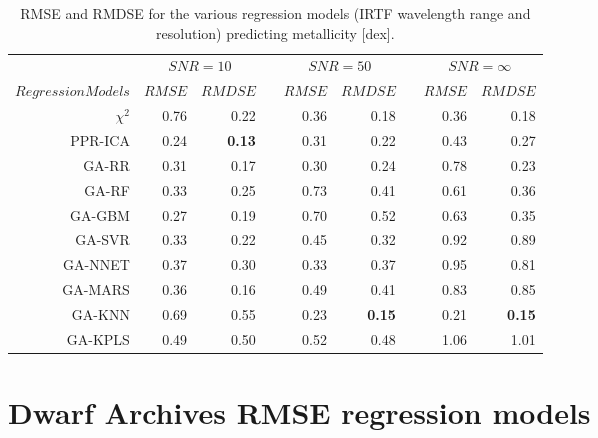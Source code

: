 \begin{table*}\centering
\begin{tabular}{@{}rrrcrrcrr@{}}\hline
& \multicolumn{2}{c}{$SNR = 10$} & \phantom{ab}& \multicolumn{2}{c}{$SNR = 50$} &
\phantom{ab} & \multicolumn{2}{c}{$SNR = \infty$}\\
\cmidrule{2-3} \cmidrule{5-6} \cmidrule{8-9}
$Regression Models$ & $RMSE$ & $RMDSE$ && $RMSE$ & $RMDSE$     && $RMSE$       & $RMDSE$ \\ \midrule
$\chi^2$    & 0.76 & 0.22      && 0.36 & 0.18     && 0.36 & 0.18 \\
PPR-ICA   & 0.24 & \bf{0.13} && 0.31 & 0.22     && 0.43 & 0.27 \\
GA-RR     & 0.31 & 0.17      && 0.30 & 0.24     && 0.78 & 0.23 \\
GA-RF     & 0.33 & 0.25      && 0.73 & 0.41     && 0.61 & 0.36 \\
GA-GBM    & 0.27 & 0.19      && 0.70 & 0.52     && 0.63 & 0.35 \\
GA-SVR    & 0.33 & 0.22      && 0.45 & 0.32     && 0.92 & 0.89 \\
GA-NNET   & 0.37 & 0.30      && 0.33 & 0.37     && 0.95 & 0.81 \\
GA-MARS   & 0.36 & 0.16      && 0.49 & 0.41     && 0.83 & 0.85 \\
GA-KNN    & 0.69 & 0.55      && 0.23 & \bf{0.15}&& 0.21 & \bf{0.15} \\ 
GA-KPLS   & 0.49 & 0.50      && 0.52 & 0.48     && 1.06 & 1.01 \\


\hline
\end{tabular}
\caption {RMSE and RMDSE for the various regression models (IRTF
  wavelength range and resolution) predicting metallicity [dex].}
\label{tab:irtf-met-rmse} 
\end{table*}


\section{Dwarf Archives RMSE regression models}
\label{sec:ipac-rmse}

